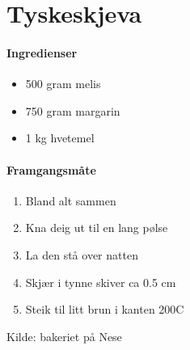 \section{﻿Tyskeskjeva}


\paragraph{Ingredienser}
\begin{itemize}[noitemsep]
	\item 500 gram melis
	\item 750 gram margarin
	\item 1 kg hvetemel
\end{itemize}

\paragraph{Framgangsmåte}
\begin{enumerate}[noitemsep]
	\item Bland alt sammen
	\item Kna deig ut til en lang pølse
	\item La den stå over natten
	\item Skjær i tynne skiver ca 0.5 cm
	\item Steik til litt brun i kanten 200\degree C
\end{enumerate}

Kilde: bakeriet på Nese
